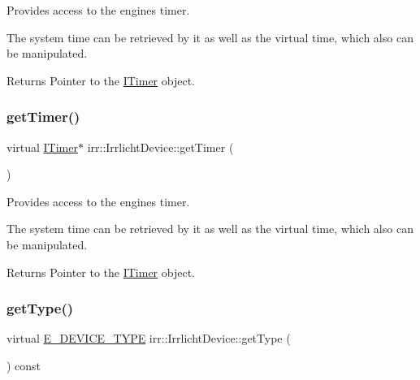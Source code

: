Provides access to the engine\textquotesingle{}s timer. 

The system time can be retrieved by it as well as the virtual time, which also can be manipulated. \begin{DoxyReturn}{Returns}
Pointer to the \hyperlink{classirr_1_1ITimer}{I\+Timer} object. 
\end{DoxyReturn}
\mbox{\label{classirr_1_1IrrlichtDevice_a96c30fb7f644e1d1dabff563bde26460}} 
\subsubsection{\texorpdfstring{get\+Timer()}{getTimer()}\hspace{0.1cm}{\footnotesize\ttfamily [2/2]}}
{\footnotesize\ttfamily virtual \hyperlink{classirr_1_1ITimer}{I\+Timer}$\ast$ irr\+::\+Irrlicht\+Device\+::get\+Timer (\begin{DoxyParamCaption}{ }\end{DoxyParamCaption})\hspace{0.3cm}{\ttfamily [pure virtual]}}



Provides access to the engine\textquotesingle{}s timer. 

The system time can be retrieved by it as well as the virtual time, which also can be manipulated. \begin{DoxyReturn}{Returns}
Pointer to the \hyperlink{classirr_1_1ITimer}{I\+Timer} object. 
\end{DoxyReturn}
\mbox{\label{classirr_1_1IrrlichtDevice_a2a2ec439b1f153169003c4d3e986a7d7}} 
\subsubsection{\texorpdfstring{get\+Type()}{getType()}\hspace{0.1cm}{\footnotesize\ttfamily [1/2]}}
{\footnotesize\ttfamily virtual \hyperlink{namespaceirr_ac25d94cf2e1037c7ca18ee79b3bd4505}{E\+\_\+\+D\+E\+V\+I\+C\+E\+\_\+\+T\+Y\+PE} irr\+::\+Irrlicht\+Device\+::get\+Type (\begin{DoxyParamCaption}{ }\end{DoxyParamCaption}) const\hspace{0.3cm}{\ttfamily [pure virtual]}}



